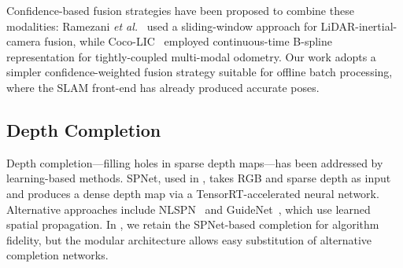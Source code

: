 Confidence-based fusion strategies have been proposed to combine these
modalities: Ramezani \emph{et al.}~\cite{ramezani2022_wildcat} used a
sliding-window approach for LiDAR-inertial-camera fusion, while
Coco-LIC~\cite{lang2023_cocolic} employed continuous-time B-spline
representation for tightly-coupled multi-modal odometry.
Our work adopts a simpler confidence-weighted fusion strategy suitable
for offline batch processing, where the SLAM front-end has already
produced accurate poses.

\subsection{Depth Completion}

Depth completion---filling holes in sparse depth maps---has been
addressed by learning-based methods.
SPNet, used in \gaussianlic, takes RGB and sparse depth as input and
produces a dense depth map via a TensorRT-accelerated neural network.
Alternative approaches include NLSPN~\cite{park2020_nlspn} and
GuideNet~\cite{tang2020_guidenet}, which use learned spatial propagation.
In \winlic, we retain the SPNet-based completion for algorithm fidelity,
but the modular architecture allows easy substitution of alternative
completion networks.
